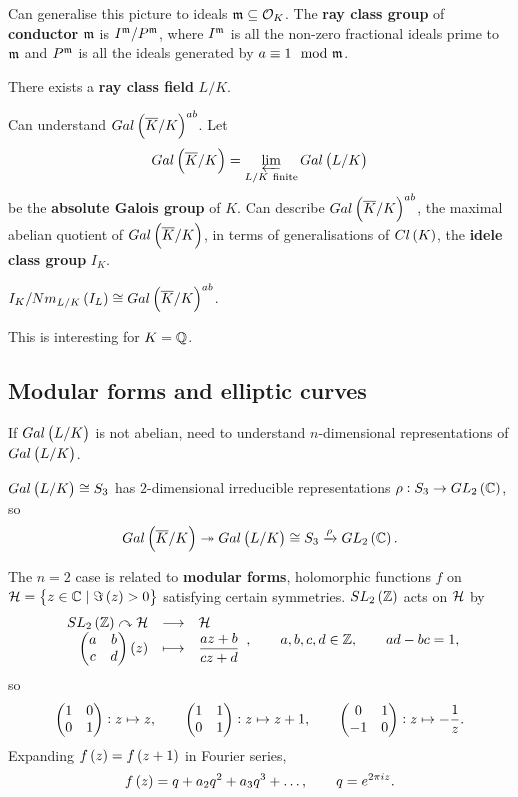 \pagebreak

Can generalise this picture to ideals $ \mathfrak{m} \subseteq \mathcal{O}_K $. The \textbf{ray class group} of \textbf{conductor} $ \mathfrak{m} $ is $ I^{\mathfrak{m}} / P^{\mathfrak{m}} $, where $ I^{\mathfrak{m}} $ is all the non-zero fractional ideals prime to $ \mathfrak{m} $ and $ P^{\mathfrak{m}} $ is all the ideals generated by $ a \equiv 1 \mod {\mathfrak{m}} $.

\begin{theorem}
There exists a \textbf{ray class field} $ L / K $.
\end{theorem}

Can understand $ Gal\br{\overline{K} / K}^{ab} $. Let
$$ Gal\br{\overline{K} / K} = \varprojlim_{L / K \ \text{finite}} Gal\br{L / K} $$
be the \textbf{absolute Galois group} of $ K $. Can describe $ Gal\br{\overline{K} / K}^{ab} $, the maximal abelian quotient of $ Gal\br{\overline{K} / K} $, in terms of generalisations of $ Cl\br{K} $, the \textbf{idele class group} $ I_K $.

\begin{theorem}
$ I_K / Nm_{L / K}\br{I_L} \cong Gal\br{\overline{K} / K}^{ab} $.
\end{theorem}

This is interesting for $ K = \mathbb{Q} $.

\subsection{Modular forms and elliptic curves}

If $ Gal\br{L / K} $ is not abelian, need to understand $ n $-dimensional representations of $ Gal\br{L / K} $.

\begin{example*}
$ Gal\br{L / K} \cong S_3 $ has $ 2 $-dimensional irreducible representations $ \rho : S_3 \to GL_2\br{\C} $, so
$$ Gal\br{\overline{K} / K} \twoheadrightarrow Gal\br{L / K} \cong S_3 \xrightarrow{\rho} GL_2\br{\C}. $$
\end{example*}

The $ n = 2 $ case is related to \textbf{modular forms}, holomorphic functions $ f $ on $ \HH = \cbr{z \in \C \mid \Im\br{z} > 0} $ satisfying certain symmetries. $ SL_2\br{\Z} $ acts on $ \mathcal{H} $ by
$$ \function{SL_2\br{\Z} \curvearrowright \HH}{\HH}{\twobytwo{a}{b}{c}{d}\br{z}}{\dfrac{az + b}{cz + d}}, \qquad a, b, c, d \in \Z, \qquad ad - bc = 1, $$
so
$$ \begin{pmatrix} 1 & 0 \\ 0 & 1 \end{pmatrix} : z \mapsto z, \qquad \begin{pmatrix} 1 & 1 \\ 0 & 1 \end{pmatrix} : z \mapsto z + 1, \qquad \begin{pmatrix} 0 & 1 \\ -1 & 0 \end{pmatrix} : z \mapsto -\dfrac{1}{z}. $$
Expanding $ f\br{z} = f\br{z + 1} $ in Fourier series,
$$ f\br{z} = q + a_2q^2 + a_3q^3 + \dots, \qquad q = e^{2\pi iz}. $$


